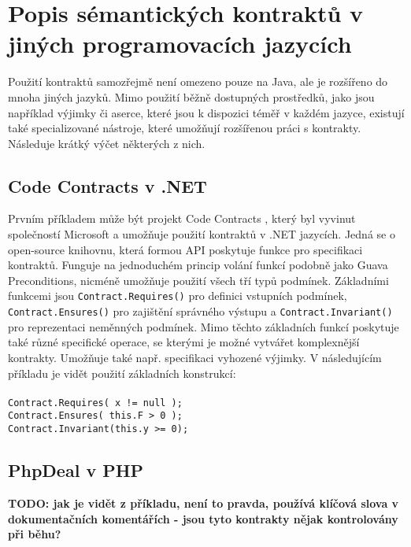 	\section{Popis sémantických kontraktů v jiných programovacích jazycích}
		Použití kontraktů samozřejmě není omezeno pouze na Java, ale je rozšířeno do mnoha jiných jazyků. Mimo použití běžně dostupných prostředků, jako jsou například výjimky či aserce, které jsou k dispozici téměř v každém jazyce, existují také specializované nástroje, které umožňují rozšířenou práci s kontrakty. Následuje krátký výčet některých z nich.
		
		\subsection{Code Contracts v .NET}
			Prvním příkladem může být projekt Code Contracts \cite{codeContracts}\cite{codeContracts2}, který byl vyvinut společností Microsoft a umožňuje použití kontraktů v .NET jazycích. Jedná se o open-source knihovnu, která formou API poskytuje funkce pro specifikaci kontraktů. Funguje na jednoduchém princip volání funkcí podobně jako Guava Preconditions, nicméně umožňuje použití všech tří typů podmínek. Základními funkcemi jsou \texttt{Contract.Requires()} pro definici vstupních podmínek, \texttt{Contract.Ensures()} pro zajištění správného výstupu a \texttt{Contract.Invariant()} pro reprezentaci neměnných podmínek. Mimo těchto základních funkcí poskytuje také různé specifické operace, se kterými je možné vytvářet komplexnější kontrakty. Umožňuje také např. specifikaci vyhozené výjimky. V následujícím příkladu je vidět použití základních konstrukcí:\\\\
			\- \- \- \- \- \texttt{Contract.Requires( x != null );}\\
			\- \- \- \- \- \texttt{Contract.Ensures( this.F > 0 );}\\
			\- \- \- \- \- \texttt{Contract.Invariant(this.y >= 0);}

			
		\subsection{PhpDeal v PHP}
	
\textbf{\textcolor{pblue}{TODO: jak je vidět z příkladu, není to pravda, používá klíčová slova v dokumentačních komentářích - jsou tyto kontrakty nějak kontrolovány při běhu?	}}\\
		
